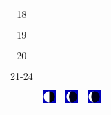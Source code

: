 \documentclass[a4paper,12pt, tikz]{scrartcl}
\begin{document}
\begin{tabularx}{\linewidth}{|c|X|X|X|}
      \hline
      18&   &       &    \\
        &   &       &    \\
      \hline
      19&   &       &    \\
        &   &       &    \\
      \hline
      20&   &       &    \\
        &   &       &    \\
      \hline
      21-24&   &       &    \\
        &   &       &    \\
      \hline  
      & \vspace{0.01cm} \centerline{\includegraphics[width=0.5cm]{moon_phases/Moon_phase_6.svg.png}} \vspace{0.1cm} & \vspace{0.01cm} \centerline{\includegraphics[width=0.5cm]{moon_phases/Moon_phase_7.svg.png}} \vspace{0.1cm} & \vspace{0.01cm} \centerline{\includegraphics[width=0.5cm]{moon_phases/Moon_phase_7.svg.png}} \vspace{0.1cm}\\
      \hline   
    \end{tabularx}




    \newpage

        \noindent
\end{document}

